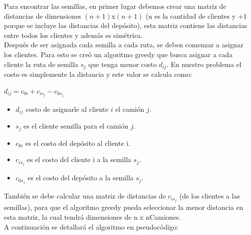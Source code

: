 \documentclass[letter, 10pt]{article}
\begin{document}
Para encontrar las semillas, en primer lugar debemos crear una matriz de distancias de dimensiones $(n+1)$x$(n+1)$ (n es la cantidad de clientes y +1 porque se incluye las distancias del depósito), esta matriz contiene las distancias entre todos los clientes y además es simétrica.\\
Después de ser asignada cada semilla a cada ruta, se deben comenzar a asignar los clientes. Para esto se creó un algoritmo greedy que busca asignar a cada cliente la ruta de semilla $s_{j}$ que tenga menor costo $d_{ij}$. En nuestro problema el costo es simplemente la distancia y este valor se calcula como:
\begin{center}
    $d_{ij} = c_{0i} + c_{is_{j}} - c_{0s_{j}}$
\end{center}
\begin{itemize}
    \item $d_{ij}$ costo de asignarle al cliente $i$ el camión $j$.
    \item $s_{j}$ es el cliente semilla para el camión $j$.
    \item $c_{0i}$ es el costo del depósito al cliente i.
    \item $c_{is_{j}}$ es el costo del cliente i a la semilla $s_{j}$.
    \item $c_{0s_{j}}$ es el costo del depósito a la semilla $s_{j}$.
\end{itemize}
También se debe calcular una matriz de distancias de $c_{is_{j}}$ (de los clientes a las semillas), para que el algoritmo greedy pueda seleccionar la menor distancia en esta matriz, la cual tendrá dimensiones de n x nCamiones.\\
A continuación se detallará el algoritmo en pseudocódigo:\\
\end{document}
